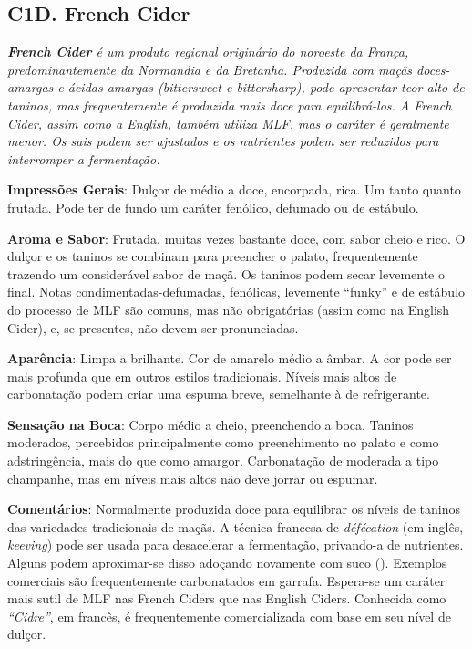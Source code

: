 \subsection*{C1D. French Cider}

\textit{\textbf{French Cider} é um produto regional originário do noroeste da França, predominantemente da Normandia e da Bretanha. Produzida com maçãs doces-amargas e ácidas-amargas (\textit{bittersweet} e \textit{bittersharp}), pode apresentar teor alto de taninos, mas frequentemente é produzida mais doce para equilibrá-los. A French Cider, assim como a English, também utiliza MLF, mas o caráter é geralmente menor. Os sais podem ser ajustados e os nutrientes podem ser reduzidos para interromper a fermentação.}

\textbf{Impressões Gerais}: Dulçor de médio a doce, encorpada, rica. Um tanto quanto frutada. Pode ter de fundo um caráter fenólico, defumado ou de estábulo.

\textbf{Aroma e Sabor}: Frutada, muitas vezes bastante doce, com sabor cheio e rico. O dulçor e os taninos se combinam para preencher o palato, frequentemente trazendo um considerável sabor de maçã. Os taninos podem secar levemente o final. Notas condimentadas-defumadas, fenólicas, levemente “funky” e de estábulo do processo de MLF são comuns, mas não obrigatórias (assim como na English Cider), e, se presentes, não devem ser pronunciadas.

\textbf{Aparência}: Limpa a brilhante. Cor de amarelo médio a âmbar. A cor pode ser mais profunda que em outros estilos tradicionais. Níveis mais altos de carbonatação podem criar uma espuma breve, semelhante à de refrigerante.

\textbf{Sensação na Boca}: Corpo médio a cheio, preenchendo a boca. Taninos moderados, percebidos principalmente como preenchimento no palato e como adstringência, mais do que como amargor. Carbonatação de moderada a tipo champanhe, mas em níveis mais altos não deve jorrar ou espumar.

\textbf{Comentários}: Normalmente produzida doce para equilibrar os níveis de taninos das variedades tradicionais de maçãs. A técnica francesa de \textit{défécation} (em inglês, \textit{keeving}) pode ser usada para desacelerar a fermentação, privando-a de nutrientes. Alguns podem aproximar-se disso adoçando novamente com suco (). Exemplos comerciais são frequentemente carbonatados em garrafa. Espera-se um caráter mais sutil de MLF nas French Ciders que nas English Ciders. Conhecida como \textit{“Cidre”}, em francês, é frequentemente comercializada com base em seu nível de dulçor.

